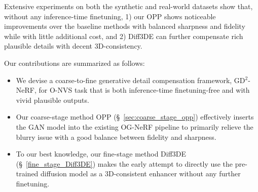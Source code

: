 % 

Extensive experiments on both the synthetic and real-world datasets show that, without any inference-time finetuning, 1) our OPP shows noticeable improvements over the baseline methods with balanced sharpness and fidelity while with little additional cost, and 2) Diff3DE can further compensate rich plausible details with decent 3D-consistency. 

Our contributions are summarized as follows:
\begin{itemize}

    \item  We devise a coarse-to-fine generative detail compensation framework, GD$^2$-NeRF, for O-NVS task that is both inference-time finetuning-free and with vivid plausible outputs.

    \item Our coarse-stage method OPP (\S~\ref{sec:coarse_stage_opp}) effectively inserts the GAN model into the existing OG-NeRF pipeline to primarily relieve the blurry issue with a good balance between fidelity and sharpness.

    \item To our best knowledge, our fine-stage method Diff3DE (\S~\ref{fine_stage_Diff3DE}) makes the early attempt to directly use the pre-trained diffusion model as a 3D-consistent enhancer without any further finetuning.
 
\end{itemize}



